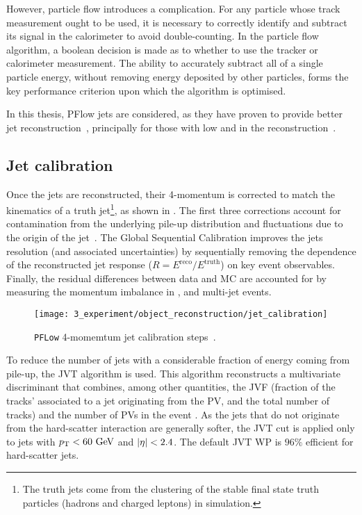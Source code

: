 However, particle flow introduces a complication. For any particle whose track measurement ought to be used, it is necessary to correctly identify and subtract its signal in the calorimeter to avoid double-counting. In the particle flow algorithm, a boolean decision is made as to whether to use the tracker or calorimeter measurement. The ability to accurately subtract all of a single particle energy, without removing energy deposited by other particles, forms the key performance criterion upon which the algorithm is optimised.

In this thesis, \ac{PFlow} jets are considered, as they have proven to provide better jet reconstruction~\cite{ATLASJetPerformancePFlow}, principally for those with low \pt and in the \met reconstruction~\cite{ATLASMETPerformance2016}.


\subsection{Jet calibration}

Once the jets are reconstructed, their 4-momentum is corrected to match the kinematics of a truth jet\footnote{The truth jets come from the \antikt clustering of the stable final state truth particles (hadrons and charged leptons) in simulation.}, as shown in \Fig{\ref{fig:objects:jets:jet_calib:jet_calib_sequence}}. The first three corrections account for contamination from the underlying pile-up distribution and fluctuations due to the origin of the jet~\cite{ATLASJetCalibrationRun2}. The Global Sequential Calibration improves the jets \pt resolution (and associated uncertainties) by sequentially removing the dependence of the reconstructed jet response (\(R= E^{\text{reco}} / E^{\text{truth}}\)) on key event observables. Finally, the residual differences between data and \ac{MC} are accounted for by
measuring the momentum imbalance in \Zjets, \gammajet and multi-jet events.

\begin{figure}[ht!]
    \centering
    \texttt{[image: 3\_experiment/object\_reconstruction/jet\_calibration]}
    \caption{\texttt{PFLow} 4-momemtum jet calibration steps~\cite{ATLASJetCalibrationRun2}.}
    \label{fig:objects:jets:jet_calib:jet_calib_sequence}
\end{figure}

To reduce the number of jets with a considerable fraction of energy coming from pile-up, the \ac{JVT} algorithm is used. This algorithm  reconstructs a multivariate discriminant that combines, among other quantities, the \ac{JVF} (fraction of the tracks' \pt associated to a jet originating from the \ac{PV}, and the total number of tracks) and the number of \acp{PV} in the event \Npv. As the jets that do not originate from the hard-scatter interaction are generally softer, the \ac{JVT} cut is applied only to jets with \(p_{\text{T}}<60~\text{GeV}\) and \(|\eta|<2.4\). The default \ac{JVT} \ac{WP} is \(96\%\) efficient for hard-scatter jets.

